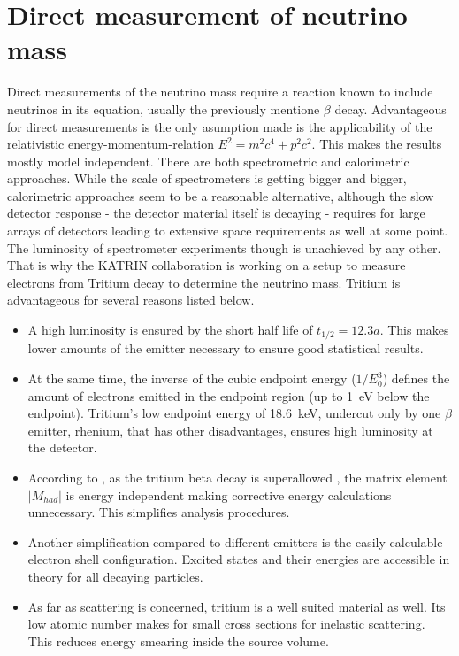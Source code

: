     
    \section{Direct measurement of neutrino mass}
    \label{ch:Introduction:sec:Massive neutrino:subsec:direct Neutrino Mass measurement}
    Direct measurements of the neutrino mass require a reaction known to include neutrinos in its equation, usually the previously mentione $\beta$ decay. Advantageous for direct measurements is the only asumption made is the applicability of the relativistic energy-momentum-relation $E^2 = m^2c^4 + p^2c^2$. This makes the results mostly model independent. There are both spectrometric and calorimetric approaches. While the scale of spectrometers is getting bigger and bigger, calorimetric approaches seem to be a reasonable alternative, although the slow detector response - the detector material itself is decaying - requires for large arrays of detectors leading to extensive space requirements as well at some point. The luminosity of spectrometer experiments though is unachieved by any other. That is why the KATRIN collaboration is working on a setup to measure electrons from Tritium decay to determine the neutrino mass. 
    Tritium is advantageous for several reasons listed below.
    \begin{itemize}
    	\item A high luminosity is ensured by the short half life of $t_{1/2} = 12.3 a$. This makes lower amounts of the emitter necessary to ensure good statistical results.
    	\item At the same time, the inverse of the cubic endpoint energy ($1/E_0^3$) defines the amount of electrons emitted in the endpoint region (up to \SI {1}{\electronvolt} below the endpoint). Tritium's low endpoint energy of \SI{18.6}{\kilo\electronvolt}, undercut only by one $\beta$ emitter, rhenium, that has other disadvantages, ensures high luminosity at the detector.
    	\item According to \cite{superallowance}, as the tritium beta decay is superallowed , the matrix element $\left|M_{had}\right|$ is energy independent making corrective energy calculations unnecessary. This simplifies analysis procedures.
    	\item Another simplification compared to different emitters is the easily calculable electron shell configuration. Excited states and their energies are accessible in theory for all decaying particles.
    	\item As far as scattering is concerned, tritium is a well suited material as well. Its low atomic number makes for small cross sections for inelastic scattering. This reduces energy smearing inside the source volume.
    \end{itemize}
